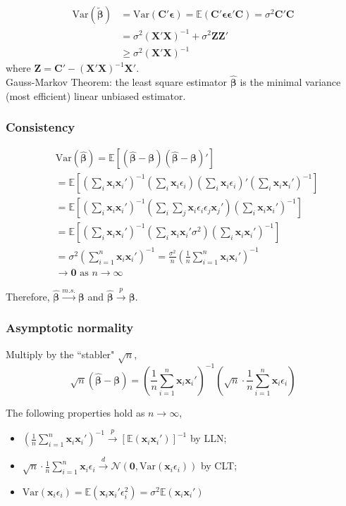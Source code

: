 \documentclass[%
 aip,
 jmp,%
 amsmath,amssymb,
 reprint,%
]{revtex4-1}
\def\N{{\mathbb N}}
\def\b{\beta}
\def\e{\epsilon}
\def\s{\sigma}
\def\E{\mathbb{E}}
\def\N{\mathcal{N}} %
\def\Var{\mathrm{Var}}
\def\msto{\xrightarrow{m.s.}}
\def\pto{\overset{p}{\to}}
\def\dto{\overset{d}{\to}}
\def\h{\hat}
\def\t{\tilde}
\def\l{\left}
\def\r{\right}
\newcommand{\sumn}[1]{\sum_{i=1}^{n} #1}
\newcommand{\mean}[1]{\frac{1}{n}\sum_{i=1}^{n} #1}
\newcommand{\mat}[1]{\bm{#1}}
\renewcommand{\vec}[1]{\bm{#1}}
\begin{document}
\begin{align*}
\Var{(\vec{\t\b})} &= \Var{(\mat C'\vec \e)} = \E(\mat C' \vec\e \vec\e' \mat C) = \s^2 \mat C'\mat C \\
&= \s^2(\mat X' \mat X)^{-1} + \s^2\mat Z\mat Z'\\
&\ge \s^2 (\mat X' \mat X)^{-1}
\end{align*}
where $\mat Z = \mat C' - (\mat X' \mat X)^{-1}\mat X'$.\\

Gauss-Markov Theorem: the least square estimator $\vec{\h\b}$ is
the minimal variance (most efficient) linear unbiased estimator.

\subsubsection{Consistency}

\begin{align*}
    &\Var{(\vec{\h\b})}
     = \E[(\vec{\h\b}-\vec{\b})(\vec{\h\b}-\vec{\b})'] \\
    &= \textstyle \E\l[\l(\sum_i \vec x_i\vec x_i'\r)^{-1} \l(\sum_i \vec x_i\e_i\r) \l(\sum_i \vec x_i\e_i\r)' \l(\sum_i \vec x_i\vec x_i'\r)^{-1}\r] \\
    &= \textstyle \E\l[\l(\sum_i \vec x_i\vec x_i'\r)^{-1} \l(\sum_i\sum_j \vec x_i\e_i\e_j \vec x_j'\r) \l(\sum_i \vec x_i\vec x_i'\r)^{-1}\r] \\
    &= \textstyle \E\l[\l(\sum_i \vec x_i\vec x_i'\r)^{-1} \l(\sum_i \vec x_i\vec x_i' \s^2 \r) \l(\sum_i \vec x_i\vec x_i'\r)^{-1}\r] \\
    &= \textstyle \s^2 \l(\sumn \vec x_i \vec x_i'\r)^{-1}
    = \frac{\s^2}{n} \l(\mean \vec x_i \vec x_i'\r)^{-1} \\
    &\to \mat 0 \textrm{ as } n \to \infty
\end{align*}

Therefore, $\vec{\h\b} \msto \vec{\b}$ and $\vec{\h\b} \pto \vec{\b}$.

\subsubsection{Asymptotic normality}

Multiply by the ``stabler" $\sqrt{n}$,
$$ \sqrt{n}(\vec{\h\b}-\vec{\b}) = \l(\mean \vec x_i \vec x_i'\r)^{-1} \l(\sqrt{n}\cdot\mean \vec x_i \e_i\r)$$

The following properties hold as $n \to \infty$,
\begin{itemize}
    \item $\l(\mean \vec x_i \vec x_i'\r)^{-1} \pto [\E(\vec x_i \vec x_i')]^{-1}$ by LLN;
    \item $\sqrt{n}\cdot\mean \vec x_i \e_i \dto \N(\vec 0, \Var{(\vec x_i \e_i)})$ by CLT;
    \item $\Var{(\vec x_i \e_i)} = \E(\vec x_i\vec x_i'\e_i^2) = \s^2 \E(\vec x_i \vec x_i')$
\end{itemize}
\end{document}
